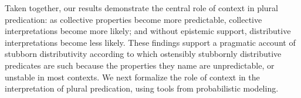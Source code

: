 \documentclass[linguex]{sp}
\begin{document}
%

Taken together, our results demonstrate the central role of context in plural predication: as collective properties become more predictable, collective interpretations become more likely; and without epistemic support, distributive interpretations become less likely. These findings support a pragmatic account of stubborn distributivity according to which ostensibly stubbornly distributive predicates are such because the properties they name are unpredictable, or unstable in most contexts. We next formalize the role of context in the interpretation of plural predication, using tools from probabilistic modeling.

\end{document}
